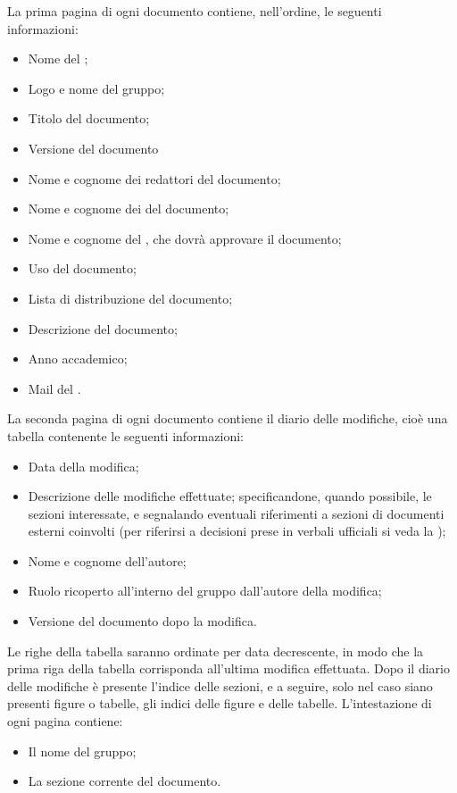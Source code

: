 La prima pagina di ogni documento contiene, nell'ordine, le seguenti informazioni:
\begin{itemize}
\item Nome del ;
\item Logo e nome del gruppo;
\item Titolo del documento;
\item Versione del documento
\item Nome e cognome dei redattori del documento;
\item Nome e cognome dei \rVs del documento;
\item Nome e cognome del \rRP, che dovrà approvare il documento;
\item Uso del documento;
\item Lista di distribuzione del documento;
\item Descrizione del documento;
\item Anno accademico;
\item Mail del .
\end{itemize}
\label{diarioModifiche}
La seconda pagina di ogni documento contiene il diario delle modifiche, cioè una tabella contenente le seguenti informazioni:
\begin{itemize}
\item Data della modifica;
\item Descrizione delle modifiche effettuate; specificandone, quando possibile, le sezioni interessate, e segnalando eventuali riferimenti a sezioni di documenti esterni coinvolti (per riferirsi a decisioni prese in verbali ufficiali si veda la );
\item Nome e cognome dell'autore;
\item Ruolo ricoperto all'interno del gruppo dall'autore della modifica;
\item Versione del documento dopo la modifica.
\end{itemize}
Le righe della tabella saranno ordinate per data decrescente, in modo che la prima riga della tabella corrisponda all'ultima modifica effettuata.
Dopo il diario delle modifiche è presente l'indice delle sezioni, e a seguire, solo nel caso siano presenti figure o tabelle, gli indici delle figure e delle tabelle.
L'intestazione di ogni pagina contiene:
\begin{itemize}
\item Il nome del gruppo;
\item La sezione corrente del documento.
\end{itemize}
